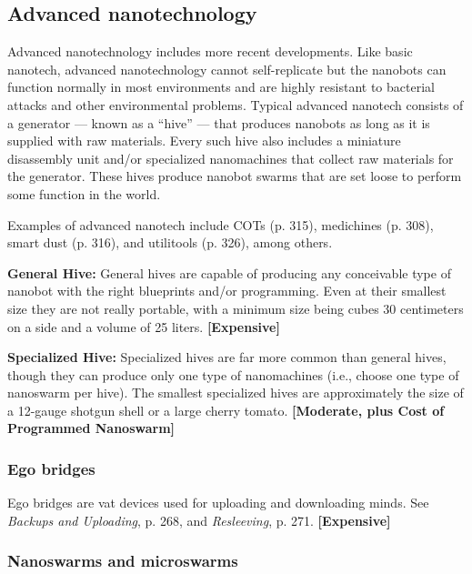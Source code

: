 \subsection{Advanced nanotechnology} \label{sec:advanced-nanotech} 

Advanced nanotechnology includes more recent developments. Like basic nanotech, advanced nanotechnology cannot self-replicate but the nanobots can function normally in most environments and are highly resistant to bacterial attacks and other environmental problems. Typical advanced nanotech consists of a generator --- known as a ``hive'' --- that produces nanobots as long as it is supplied with raw materials. Every such hive also includes a miniature disassembly unit and/or specialized nanomachines that collect raw materials for the generator. These hives produce nanobot swarms that are set loose to perform some function in the world. 

Examples of advanced nanotech include COTs (p. 315), medichines (p. 308), smart dust (p. 316), and utilitools (p. 326), among others. 

\textbf{General Hive:} General hives are capable of producing any conceivable type of nanobot with the right blueprints and/or programming. Even at their smallest size they are not really portable, with a minimum size being cubes 30 centimeters on a side and a volume of 25 liters. \textbf{[Expensive]} 

\textbf{Specialized Hive:} Specialized hives are far more common than general hives, though they can produce only one type of nanomachines (i.e., choose one type of nanoswarm per hive). The smallest specialized hives are approximately the size of a 12-gauge shotgun shell or a large cherry tomato. \textbf{[Moderate, plus Cost of Programmed Nanoswarm]} 

\subsubsection{Ego bridges} 

Ego bridges are vat devices used for uploading and downloading minds. See \emph{Backups and Uploading}, p. 268, and \emph{Resleeving}, p. 271. \textbf{[Expensive]} 

\subsubsection{Nanoswarms and microswarms} 

